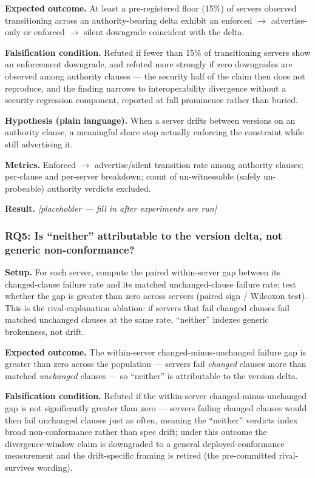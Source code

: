 \documentclass[11pt]{article}
\newcommand{\ph}{\textit{[placeholder --- fill in after experiments are run]}}
\begin{document}
\textbf{Expected outcome.} At least a pre-registered floor (15\%) of servers observed transitioning across an authority-bearing delta exhibit an enforced $\to$ advertise-only or enforced $\to$ silent downgrade coincident with the delta.

\textbf{Falsification condition.} Refuted if fewer than 15\% of transitioning servers show an enforcement downgrade, and refuted more strongly if zero downgrades are observed among authority clauses --- the security half of the claim then does not reproduce, and the finding narrows to interoperability divergence without a security-regression component, reported at full prominence rather than buried.

\textbf{Hypothesis (plain language).} When a server drifts between versions on an authority clause, a meaningful share stop actually enforcing the constraint while still advertising it.

\textbf{Metrics.} Enforced $\to$ advertise/silent transition rate among authority clauses; per-clause and per-server breakdown; count of un-witnessable (safely un-probeable) authority verdicts excluded.

\textbf{Result.} \ph

\subsubsection{RQ5: Is ``neither'' attributable to the version delta, not generic non-conformance?}

\textbf{Setup.} For each server, compute the paired within-server gap between its changed-clause failure rate and its matched unchanged-clause failure rate; test whether the gap is greater than zero across servers (paired sign / Wilcoxon test). This is the rival-explanation ablation: if servers that fail changed clauses fail matched unchanged clauses at the same rate, ``neither'' indexes generic brokenness, not drift.

\textbf{Expected outcome.} The within-server changed-minus-unchanged failure gap is greater than zero across the population --- servers fail \emph{changed} clauses more than matched \emph{unchanged} clauses --- so ``neither'' is attributable to the version delta.

\textbf{Falsification condition.} Refuted if the within-server changed-minus-unchanged gap is not significantly greater than zero --- servers failing changed clauses would then fail unchanged clauses just as often, meaning the ``neither'' verdicts index broad non-conformance rather than spec drift; under this outcome the divergence-window claim is downgraded to a general deployed-conformance measurement and the drift-specific framing is retired (the pre-committed rival-survives wording).
\end{document}
